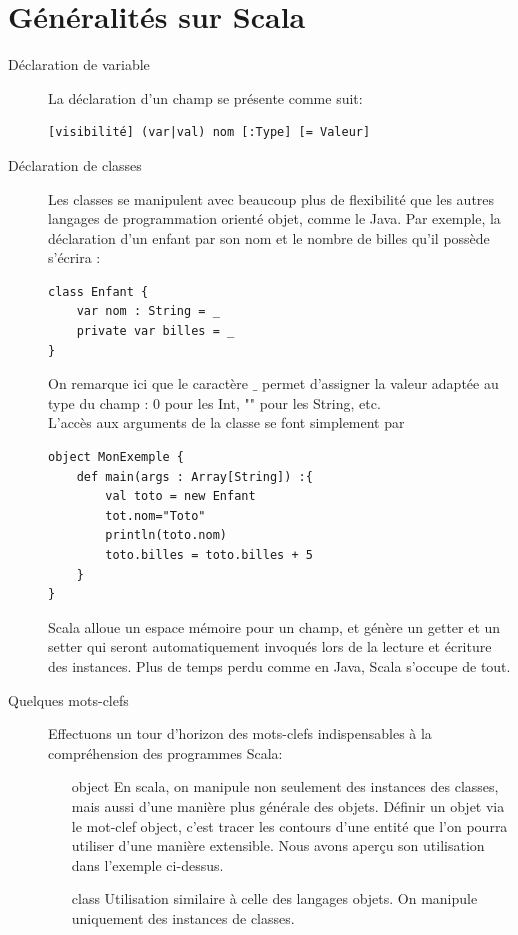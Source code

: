 \documentclass[a4paper,11pt,french]{report}
\begin{document}
\section{Généralités sur Scala}
\begin{description}
\item[Déclaration de variable] La déclaration d'un champ se présente comme suit:
\begin{verbatim}
[visibilité] (var|val) nom [:Type] [= Valeur]
\end{verbatim}
\item[Déclaration de classes] Les classes se manipulent avec beaucoup plus de flexibilité que les autres langages de programmation orienté objet, comme le Java. Par exemple, la déclaration d'un enfant par son nom et le nombre de billes qu'il possède s'écrira :
\begin{lstlisting}[frame=trBL]
class Enfant {
	var nom : String = _
	private var billes = _ 
} 
\end{lstlisting}
On remarque ici que le caractère $\_$ permet d'assigner la valeur adaptée au type du champ : 0 pour les \textsf{Int}, "" pour les \textsf{String}, etc.\\
L'accès aux arguments de la classe se font simplement par 
\begin{lstlisting}[frame=trBL]
object MonExemple {
	def main(args : Array[String]) :{
		val toto = new Enfant
		tot.nom="Toto"
		println(toto.nom)
		toto.billes = toto.billes + 5
	}
} 
\end{lstlisting}

Scala alloue un espace mémoire pour un champ, et génère un getter et un setter qui seront automatiquement invoqués lors de la lecture et écriture des instances. Plus de temps perdu comme en Java, Scala s'occupe de tout.

\item[Quelques mots-clefs] Effectuons un tour d'horizon des mots-clefs indispensables à la compréhension des programmes Scala:

\begin{itemize}
\item[\textsf{object}] En scala, on manipule non seulement des instances des classes, mais aussi d'une manière plus générale des objets. Définir un objet via le mot-clef \textsf{object}, c'est tracer les contours d'une entité que l'on pourra utiliser d'une manière extensible. Nous avons aperçu son utilisation dans l'exemple ci-dessus.\\
\item[\textsf{class}] Utilisation similaire à celle des langages objets. On manipule uniquement des instances de classes.\\


\end{itemize}
\end{description}
\end{document}
